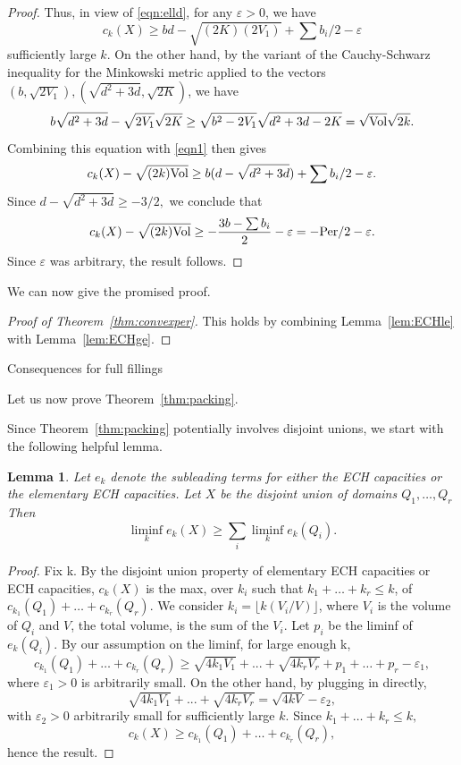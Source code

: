 \documentclass[11pt, reqno]{amsart}
\makeatletter
\def\subsection{\@startsection{subsection}{2}%
  \z@{.75\linespacing\@plus.7\linespacing}{-.5em}%
  {\normalfont\large\bfseries}}
\newtheorem{lemma}[thm]{Lemma}
\theoremstyle{remark}
\numberwithin{equation}{subsection}
\numberwithin{figure}{section}
\theoremstyle{customremark}
\newcommand{\Vol}{{\rm Vol}}
\newcommand{\Per}{{\rm Per}}
\newcommand{\eps}{\varepsilon}
\makeatother
\begin{document}
\begin{proof}
Thus, in view of \eqref{eqn:elld}, for any $\eps>0$, we have
\begin{equation}
\label{eqn1}
c_k(X) \ge bd - \sqrt{ (2K)(2V_1) } + \sum b_i/2 - \eps
\end{equation}
 sufficiently large $k$. 
On the other hand, by the variant of the Cauchy-Schwarz inequality for the Minkowski metric applied to the vectors $(b,\sqrt{2 V_1}), (\sqrt{d^2 + 3d}, \sqrt{2K})$, we have
\[ b \sqrt{d^2 + 3d} - \sqrt{ 2V_1} \sqrt{2 K} \ge \sqrt{ b^2 - 2 V_1}\sqrt{ d^2 + 3d - 2K} = \sqrt{\Vol} \sqrt{2k}.\]
Combining this equation with \eqref{eqn1} then gives
\[ c_k(X) - \sqrt{ (2k)\Vol } \ge b ( d - \sqrt{d^2 + 3d}) + \sum b_i/2 - \eps.\]
Since 
$ d - \sqrt{d^2 + 3d} \ge -3/2,$
we  conclude that $$
c_k(X) - \sqrt{ (2k)\Vol } \ge - \frac{3b - \sum b_i}{2} -  \eps= -\Per/2 - \eps.
$$
Since $\eps$ was arbitrary,   the result follows. 
\end{proof}

We can now give the promised proof.


\begin{proof}[Proof of Theorem~\ref{thm:convexper}]
This holds by combining Lemma~\ref{lem:ECHle} with Lemma~\ref{lem:ECHge}.
\end{proof}

 
\subsection{Consequences for full fillings}\label{ss:fullFilling}

Let us now prove Theorem~\ref{thm:packing}.  

Since Theorem~\ref{thm:packing} potentially involves disjoint unions, we start with the following helpful lemma.


\begin{lemma}\label{lem:sublead}
Let $e_k$ denote the subleading terms for either the ECH capacities or the elementary ECH capacities.  Let $X$ be the disjoint union of domains $Q_1, \ldots, Q_r$ 
Then  
\[ \liminf_k e_k(X) \ge \sum_i \liminf_k e_k(Q_i).\]
\end{lemma}



\begin{proof}

Fix k.  By the disjoint union property of elementary ECH capacities or ECH capacities, $c_k(X)$ is the max, over $k_i$ such that $k_1 + \ldots + k_r \leq k$, of $c_{k_1}(Q_1) + \ldots + c_{k_r}(Q_r).$  
We consider $k_i = \lfloor k (V_i / V)\rfloor$, where $V_i$ is the volume of $Q_i$ and $V$, the total volume, is the sum of the $V_i.$  Let $p_i$ be the liminf of $e_k(Q_i)$.  By our assumption on the liminf, for large enough k, 
\[ c_{k_1}(Q_1) + \ldots + c_{k_r}(Q_r) \ge \sqrt{ 4 k_1 V_1} + ... + \sqrt{4 k_r V_r} + p_1 + \ldots + p_r - \eps_1,\]
where $\eps_1 > 0$ is arbitrarily small.  On the other hand, by plugging in directly,
\[ \sqrt{ 4 k_1 V_1} + ... + \sqrt{4 k_r V_r} = \sqrt{ 4k V} - \eps_2,\]
with $\eps_2 > 0$ arbitrarily small for sufficiently large $k.$  
Since $k_1 + \ldots + k_r \le k,$ 
\[ c_k(X) \ge c_{k_1}(Q_1) + \ldots + c_{k_r}(Q_r),\] 
hence the result.
\end{proof}
\end{document}
